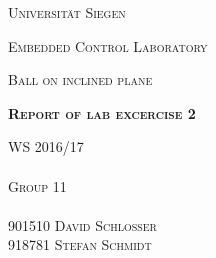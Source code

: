 \documentclass[12pt,a4paper]{article}
\begin{document}
\begin{titlepage}
	\begin{center}
	{\scshape\LARGE Universität Siegen \par}
	\vspace{3cm}
	{\scshape\LARGE Embedded Control Laboratory \par}
	\vspace{1cm}
	{\scshape\Large Ball on inclined plane \par}
	\vspace{5cm}
	{\scshape\Large\bfseries Report of lab excercise 2 \par}
	\vfill
	\end{center}
	{\scshape WS 2016/17\\ \\ Group 11\\ \\ 901510 David Schlosser\\ 918781 Stefan Schmidt \par}	
\end{titlepage}
\pagestyle{fancy}
\onehalfspacing
\tableofcontents
\newpage



\end{document}
